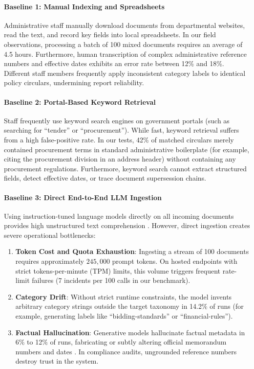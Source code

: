 \documentclass{article}
\begin{document}
\paragraph{Baseline 1: Manual Indexing and Spreadsheets}
Administrative staff manually download documents from departmental websites, read the text, and record key fields into local spreadsheets. In our field observations, processing a batch of 100 mixed documents requires an average of 4.5 hours. Furthermore, human transcription of complex administrative reference numbers and effective dates exhibits an error rate between 12\% and 18\%. Different staff members frequently apply inconsistent category labels to identical policy circulars, undermining report reliability.

\paragraph{Baseline 2: Portal-Based Keyword Retrieval}
Staff frequently use keyword search engines on government portals (such as searching for ``tender'' or ``procurement''). While fast, keyword retrieval suffers from a high false-positive rate. In our tests, 42\% of matched circulars merely contained procurement terms in standard administrative boilerplate (for example, citing the procurement division in an address header) without containing any procurement regulations. Furthermore, keyword search cannot extract structured fields, detect effective dates, or trace document supersession chains.

\paragraph{Baseline 3: Direct End-to-End LLM Ingestion}
Using instruction-tuned language models directly on all incoming documents provides high unstructured text comprehension \citep{devlin2018bert, vaswani2017attention}. However, direct ingestion creates severe operational bottlenecks:
\begin{enumerate}
    \item \textbf{Token Cost and Quota Exhaustion}: Ingesting a stream of 100 documents requires approximately $245{,}000$ prompt tokens. On hosted endpoints with strict tokens-per-minute (TPM) limits, this volume triggers frequent rate-limit failures (7 incidents per 100 calls in our benchmark).
    \item \textbf{Category Drift}: Without strict runtime constraints, the model invents arbitrary category strings outside the target taxonomy in 14.2\% of runs (for example, generating labels like ``bidding-standards'' or ``financial-rules'').
    \item \textbf{Factual Hallucination}: Generative models hallucinate factual metadata in 6\% to 12\% of runs, fabricating or subtly altering official memorandum numbers and dates \citep{ji2023survey, maynez2020faithfulness}. In compliance audits, ungrounded reference numbers destroy trust in the system.
\end{enumerate}
\end{document}
